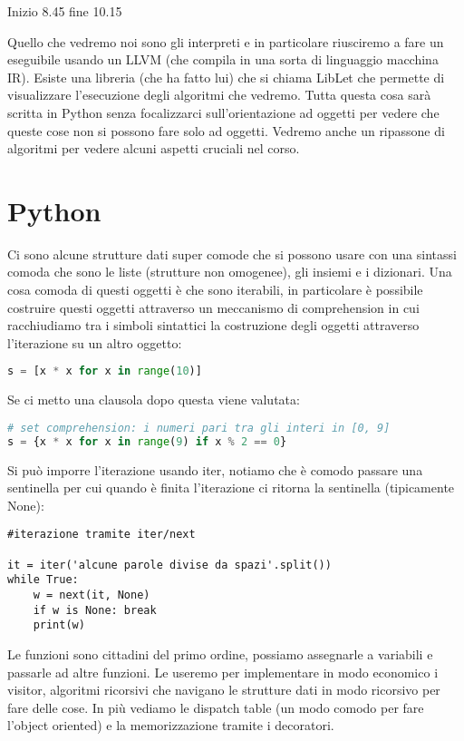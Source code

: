 Inizio 8.45 fine 10.15

Quello che vedremo noi sono gli interpreti e in particolare riusciremo a fare un eseguibile usando un LLVM (che compila in una sorta di linguaggio macchina IR).
Esiste una libreria (che ha fatto lui) che si chiama LibLet che permette di visualizzare l'esecuzione degli algoritmi che vedremo. Tutta questa cosa sarà scritta in Python senza focalizzarci sull'orientazione ad oggetti per vedere che queste cose non si possono fare solo ad oggetti.
Vedremo anche un ripassone di algoritmi per vedere alcuni aspetti cruciali nel corso.

\section{Python}
Ci sono alcune strutture dati super comode che si possono usare con una sintassi comoda che sono le liste (strutture non omogenee), gli insiemi e i dizionari. Una cosa comoda di questi oggetti è che sono iterabili, in particolare è possibile costruire questi oggetti attraverso un meccanismo di comprehension in cui racchiudiamo tra i simboli sintattici la costruzione degli oggetti attraverso l'iterazione su un altro oggetto:

\begin{lstlisting}[language=Python]
s = [x * x for x in range(10)]
\end{lstlisting}

Se ci metto una clausola dopo questa viene valutata:
\begin{lstlisting}[language=Python]
# set comprehension: i numeri pari tra gli interi in [0, 9]
s = {x * x for x in range(9) if x % 2 == 0}
\end{lstlisting}

Si può imporre l'iterazione usando iter, notiamo che è comodo passare una sentinella per cui quando è finita l'iterazione ci ritorna la sentinella (tipicamente None):
\begin{lstlisting}
#iterazione tramite iter/next

it = iter('alcune parole divise da spazi'.split())
while True:
    w = next(it, None)
    if w is None: break
    print(w)
\end{lstlisting}

Le funzioni sono cittadini del primo ordine, possiamo assegnarle a variabili e passarle ad altre funzioni.
Le useremo per implementare in modo economico i visitor, algoritmi ricorsivi che navigano le strutture dati in modo ricorsivo per fare delle cose. In più vediamo le dispatch table (un modo comodo per fare l'object oriented) e la memorizzazione tramite i decoratori.

